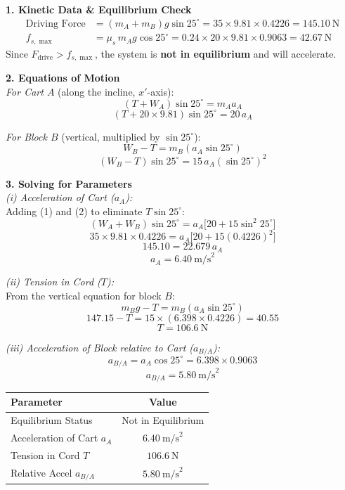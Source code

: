 \documentclass[12pt,a3paper]{article}
\begin{document}
\begin{enumerate}
\begin{tcolorbox}[enhanced,breakable,ansbox,colback=cG!4,colframe=cG,
  boxrule=0.8pt,arc=5pt,
  title={\textbf{Solution}},fonttitle=\bfseries\color{white},
  colbacktitle=cG]
\textbf{1. Kinetic Data \& Equilibrium Check}\\[4pt]
\begin{align*}
  \text{Driving Force} &= (m_A + m_B)g\sin25^\circ
    = 35 \times 9.81 \times 0.4226 = 145.10\ \text{N} \\
  f_{s,\max} &= \mu_s\, m_A g\cos25^\circ
    = 0.24 \times 20 \times 9.81 \times 0.9063 = 42.67\ \text{N}
\end{align*}
Since $F_{\text{drive}} > f_{s,\max}$, the system is \textbf{not in equilibrium}
and will accelerate.

\medskip
\textbf{2. Equations of Motion}\\[4pt]

\textit{For Cart $A$} (along the incline, $x'$-axis):
\[
  (T + W_A)\sin25^\circ = m_A a_A
\]
\[
  (T + 20 \times 9.81)\sin25^\circ = 20\,a_A \tag{1}
\]

\textit{For Block $B$} (vertical, multiplied by $\sin25^\circ$):
\[
  W_B - T = m_B(a_A \sin25^\circ)
\]
\[
  (W_B - T)\sin25^\circ = 15\,a_A(\sin25^\circ)^2 \tag{2}
\]

\medskip
\textbf{3. Solving for Parameters}\\[4pt]

\textit{(i) Acceleration of Cart ($a_A$):}\\
Adding (1) and (2) to eliminate $T\sin25^\circ$:
\[
  (W_A + W_B)\sin25^\circ = a_A\bigl[20 + 15\sin^2 25^\circ\bigr]
\]
\[
  35 \times 9.81 \times 0.4226 = a_A\bigl[20 + 15(0.4226)^2\bigr]
\]
\[
  145.10 = 22.679\,a_A
\]
\[
  \boxed{a_A = 6.40\ \text{m/s}^2}
\]

\textit{(ii) Tension in Cord ($T$):}\\
From the vertical equation for block $B$:
\[
  m_B g - T = m_B(a_A \sin25^\circ)
\]
\[
  147.15 - T = 15 \times (6.398 \times 0.4226) = 40.55
\]
\[
  \boxed{T = 106.6\ \text{N}}
\]

\textit{(iii) Acceleration of Block relative to Cart ($a_{B/A}$):}
\[
  a_{B/A} = a_A \cos25^\circ = 6.398 \times 0.9063
\]
\[
  \boxed{a_{B/A} = 5.80\ \text{m/s}^2}
\]

\medskip
\begin{center}
\renewcommand{\arraystretch}{1.4}
\begin{tabular}{lc}
  \hline
  \textbf{Parameter} & \textbf{Value} \\
  \hline
  Equilibrium Status       & Not in Equilibrium \\
  Acceleration of Cart $a_A$    & $6.40\ \text{m/s}^2$ \\
  Tension in Cord $T$           & $106.6\ \text{N}$ \\
  Relative Accel $a_{B/A}$      & $5.80\ \text{m/s}^2$ \\
  \hline
\end{tabular}
\end{center}


\end{tcolorbox}
\end{enumerate}
\end{document}
